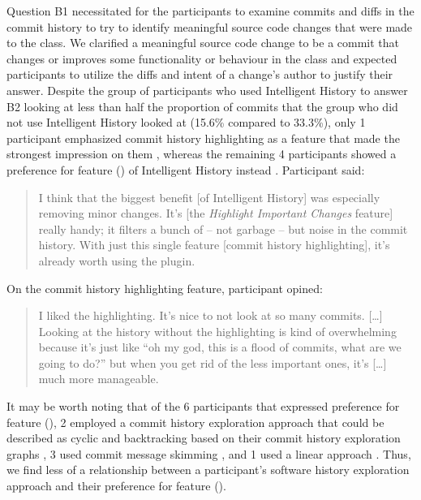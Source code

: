 Question B1 necessitated for the participants to examine commits and diffs in the  commit history to try to identify meaningful source code changes that were made to the class.
We clarified a meaningful source code change to be a commit that changes or improves some functionality or behaviour in the class and expected participants to utilize the diffs and intent of a change's author to justify their answer.
Despite the group of participants who used Intelligent History to answer B2 looking at less than half the proportion of commits that the group who did not use Intelligent History looked at (15.6\% compared to 33.3\%),
only 1 participant emphasized commit history highlighting as a feature that made the strongest impression on them , 
whereas the remaining 4 participants showed a preference for feature () of Intelligent History instead .
Participant  said:

\begin{quote}
  I think that the biggest benefit [of Intelligent History] was especially removing minor changes. 
  It’s [the \textit{Highlight Important Changes} feature] really handy; it filters a bunch of -- not garbage -- but noise in the commit history. 
  With just this single feature [commit history highlighting], it’s already worth using the plugin.
\end{quote}

On the commit history highlighting feature, participant  opined:

\begin{quote}
  I liked the highlighting. 
  It’s nice to not look at so many commits. 
  [\dots] Looking at the history without the highlighting is kind of overwhelming because it’s just like ``oh my god, this is a flood of commits, what are we going to do?'' 
  but when you get rid of the less important ones, it’s [\dots] much more manageable.
\end{quote}

It may be worth noting that of the 6 participants that expressed preference for feature (), 
2 employed a commit history exploration approach that could be described as cyclic and backtracking based on their commit history exploration graphs ,
3 used commit message skimming , and 1 used a linear approach .
Thus, we find less of a relationship between a participant's software history exploration approach and their preference for feature ().


